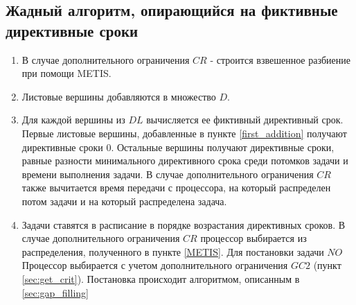 \subsection{Жадный алгоритм, опирающийся на фиктивные директивные сроки}
\begin{enumerate}
    \item \label{METIS} В случае дополнительного ограничения $CR$ - строится взвешенное разбиение при помощи METIS.
    \item \label{first_addition} Листовые вершины добавляются в множество $D$.
    \item Для каждой вершины из $DL$ вычисляется ее фиктивный директивный срок. Первые листовые вершины, добавленные в пункте \ref{first_addition} получают директивные сроки $0$. Остальные вершины получают директивные сроки, равные разности минимального директивного срока среди потомков задачи и времени выполнения задачи. В случае дополнительного ограничения $CR$ также вычитается время передачи с процессора, на который распределен потом задачи и на который распределена задача.
    \item Задачи ставятся в расписание в порядке возрастания директивных сроков. В случае дополнительного ограничения $CR$ процессор выбирается из распределения, полученного в пункте \ref{METIS}. Для постановки задачи $NO$ Процессор выбирается с учетом дополнительного ограничения $GC2$ (пункт \ref{sec:get_crit}). Постановка происходит алгоритмом, описанным в \ref{sec:gap_filling}
\end{enumerate}
